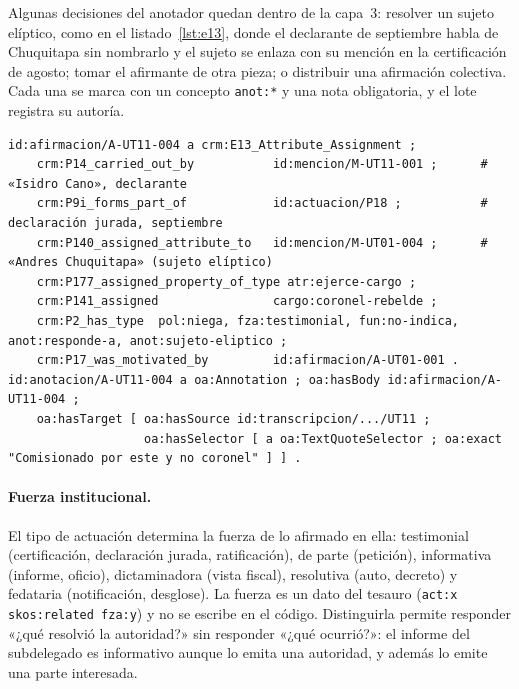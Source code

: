 \documentclass[runningheads]{llncs}
\newcommand{\ttt}[1]{\texttt{\small #1}}
\begin{document}
Algunas decisiones del anotador quedan dentro de la capa~3: resolver un sujeto elíptico, como en el
listado~\ref{lst:e13}, donde el declarante de septiembre habla de Chuquitapa sin nombrarlo y el sujeto se enlaza con
su mención en la certificación de agosto; tomar el afirmante de otra pieza; o distribuir una afirmación colectiva.
Cada una se marca con un concepto \ttt{anot:*} y una nota obligatoria, y el lote registra su autoría.

\begin{lstlisting}[language=turtle, float=t, caption={La negación de Isidro Cano en septiembre (capa 3, abreviada).
La afirmación de agosto que niega es \ttt{A-UT01-001}; \ttt{id:} abrevia aquí el espacio de nombres del expediente.}, label=lst:e13]
id:afirmacion/A-UT11-004 a crm:E13_Attribute_Assignment ;
    crm:P14_carried_out_by           id:mencion/M-UT11-001 ;      # «Isidro Cano», declarante
    crm:P9i_forms_part_of            id:actuacion/P18 ;           # declaración jurada, septiembre
    crm:P140_assigned_attribute_to   id:mencion/M-UT01-004 ;      # «Andres Chuquitapa» (sujeto elíptico)
    crm:P177_assigned_property_of_type atr:ejerce-cargo ;
    crm:P141_assigned                cargo:coronel-rebelde ;
    crm:P2_has_type  pol:niega, fza:testimonial, fun:no-indica, anot:responde-a, anot:sujeto-eliptico ;
    crm:P17_was_motivated_by         id:afirmacion/A-UT01-001 .
id:anotacion/A-UT11-004 a oa:Annotation ; oa:hasBody id:afirmacion/A-UT11-004 ;
    oa:hasTarget [ oa:hasSource id:transcripcion/.../UT11 ;
                   oa:hasSelector [ a oa:TextQuoteSelector ; oa:exact "Comisionado por este y no coronel" ] ] .
\end{lstlisting}

\paragraph{Fuerza institucional.}
El tipo de actuación determina la fuerza de lo afirmado en ella: testimonial (certificación, declaración jurada,
ratificación), de parte (petición), informativa (informe, oficio), dictaminadora (vista fiscal), resolutiva (auto,
decreto) y fedataria (notificación, desglose). La fuerza es un dato del tesauro (\ttt{act:x skos:related fza:y}) y no
se escribe en el código. Distinguirla permite responder «¿qué resolvió la autoridad?» sin responder «¿qué ocurrió?»:
el informe del subdelegado es informativo aunque lo emita una autoridad, y además lo emite una parte interesada.
\end{document}
